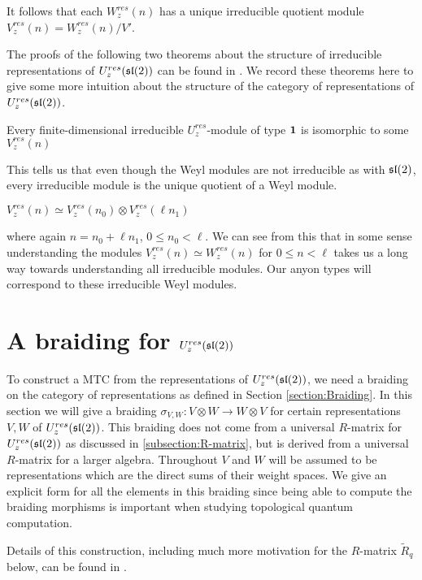 It follows that each $W_z^{res}(n)$ has a unique irreducible quotient module
$V_z^{res}(n) = W_z^{res}(n) / V'$. 

The proofs of the following two theorems about the structure of irreducible
representations of $U_z^{res}(\mathfrak{sl}(2))$ can be found in \cite{CP}. We record
these theorems here to give some more intuition about the structure of the
category of representations of $U_z^{res}(\mathfrak{sl}(2))$.
\begin{theorem}
Every finite-dimensional irreducible $U_z^{res}$-module of type $\mathbf{1}$ is isomorphic to some $V_z^{res}(n)$
\end{theorem}

This tells us that even though the Weyl modules are not irreducible as with
$\mathfrak{sl}(2)$, every irreducible module is the unique quotient of a Weyl module.

\begin{theorem}
$V_z^{res}(n) \simeq V_z^{res}(n_0) \otimes V_{z}^{res}(\ell n_1)$
\end{theorem}

where again $n = n_0 + \ell n_1$, $0 \leq n_0 < \ell$.
We can see from this that in some sense understanding the modules $V_z^{res}(n)
\simeq W_z^{res}(n)$ for $0 \leq n < \ell$ takes us a long way towards
understanding all irreducible modules. Our anyon types will correspond to
these irreducible Weyl modules.

\section{A braiding for $U_z^{res}(\mathfrak{sl}(2))$}
\label{section:braiding}

To construct a MTC from the representations of $U_z^{res}(\mathfrak{sl}(2))$, we need a
braiding on the category of representations as defined in
Section \ref{section:Braiding}.  In this section we will give a braiding $\sigma_{V,W}:
V \otimes W \to W \otimes V$ for certain representations $V,W$ of
$U_z^{res}(\mathfrak{sl}(2))$.  This braiding does not
come from a universal $R$-matrix for $U_z^{res}(\mathfrak{sl}(2))$ as discussed in
\ref{subsection:R-matrix}, but is derived from a universal $R$-matrix for a
larger algebra. Throughout $V$ and $W$ will be assumed to be representations
which are the direct sums of their weight spaces. We give an explicit form for
all the elements in this braiding since being able to compute the braiding
morphisms is important when studying topological quantum computation.

Details of this construction, including much more motivation for the $R$-matrix
$\tilde{R}_q$ below, can be found in \cite{CP}.


